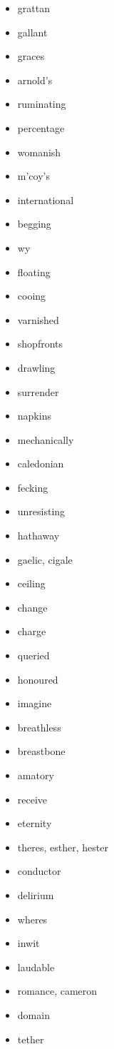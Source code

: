 \documentclass{article}
\begin{document}
\begin{itemize}
    \item grattan
    \item gallant
    \item graces
    \item arnold's
    \item ruminating
    \item percentage
    \item womanish
    \item m'coy's
    \item international
    \item begging
    \item wy
    \item floating
    \item cooing
    \item varnished
    \item shopfronts
    \item drawling
    \item surrender
    \item napkins
    \item mechanically
    \item caledonian
    \item fecking
    \item unresisting
    \item hathaway
    \item gaelic, cigale
    \item ceiling
    \item change
    \item charge
    \item queried
    \item honoured
    \item imagine
    \item breathless
    \item breastbone
    \item amatory
    \item receive
    \item eternity
    \item theres, esther, hester
    \item conductor
    \item delirium
    \item wheres
    \item inwit
    \item laudable
    \item romance, cameron
    \item domain
    \item tether

\end{itemize}
\end{document}
